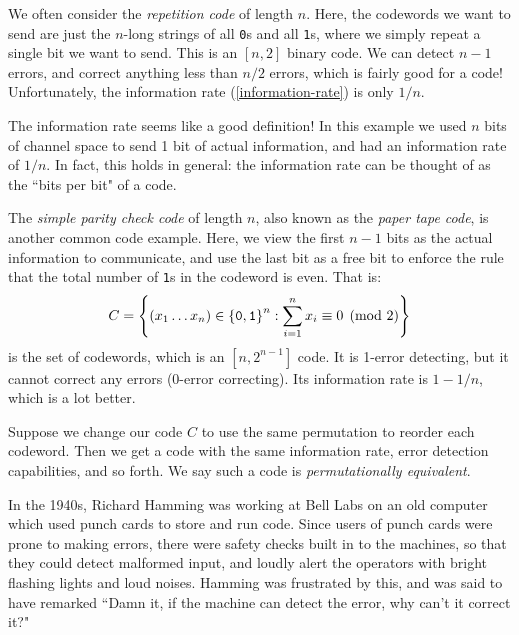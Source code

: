 \documentclass{article}
\begin{document}
We often consider the \textit{repetition code} of length $n$. Here, the codewords we want to send are just the $n$-long strings of all \texttt{0}s and all \texttt{1}s, where we simply repeat a single bit we want to send. This is an $[n, 2]$ binary code. We can detect $n-1$ errors, and correct anything less than $n/2$ errors, which is fairly good for a code! Unfortunately, the information rate (\ref{information-rate}) is only $1/n$.

\begin{note}
	The information rate seems like a good definition! In this example we used $n$ bits of channel space to send 1 bit of actual information, and had an information rate of $1/n$. In fact, this holds in general: the information rate can be thought of as the ``bits per bit" of a code.
\end{note}

\begin{example}
    The \textit{simple parity check code} of length $n$, also known as the \textit{paper tape code}, is another common code example. Here, we view the first $n-1$ bits as the actual information to communicate, and use the last bit as a free bit to enforce the rule that the total number of \texttt{1}s in the codeword is even. That is:
    \[
	C = \left\lbrace (x_1 \dots x_n) \in \left\lbrace \texttt{0}, \texttt{1} \right\rbrace^n : \sum_{i=1}^n x_i \equiv 0 \pmod 2 \right\rbrace
	\]
	is the set of codewords, which is an $[n, 2^{n-1}]$ code. It is 1-error detecting, but it cannot correct any errors (0-error correcting). Its information rate is $1- 1/n$, which is a lot better.
\end{example}

\begin{note}
	Suppose we change our code $C$ to use the same permutation to reorder each codeword. Then we get a code with the same information rate, error detection capabilities, and so forth. We say such a code is \textit{permutationally equivalent}.
\end{note}

In the 1940s, Richard Hamming was working at Bell Labs on an old computer which used punch cards to store and run code. Since users of punch cards were prone to making errors, there were safety checks built in to the machines, so that they could detect malformed input, and loudly alert the operators with bright flashing lights and loud noises. Hamming was frustrated by this, and was said to have remarked ``Damn it, if the machine can detect the error, why can't it correct it?"
\end{document}
